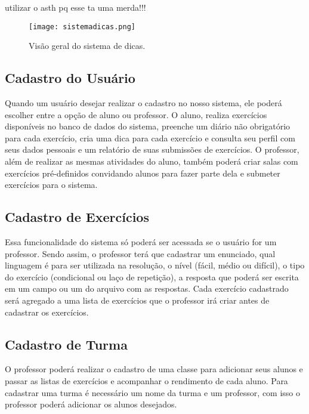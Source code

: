 utilizar o asth pq esse ta uma merda!!!

\begin{figure}[h]
	\captionsetup{justification=centering}
	\texttt{[image: sistemadicas.png]}
	\caption{Visão geral do sistema de dicas.}
	\label{figura:sistemadicas}
\end{figure}

\subsection{Cadastro do Usuário}

Quando um usuário desejar realizar o cadastro no nosso sistema, ele poderá escolher entre a opção de aluno ou professor. O aluno, realiza exercícios disponíveis no banco de dados do sistema, preenche um diário não obrigatório para cada exercício, cria uma dica para cada exercício e consulta seu perfil com seus dados pessoais e um relatório de suas submissões de exercícios. O professor, além de realizar as mesmas atividades do aluno, também poderá criar salas com exercícios pré-definidos convidando alunos para fazer parte dela e submeter exercícios para o sistema.

\subsection{Cadastro de Exercícios}

Essa funcionalidade do sistema só poderá ser acessada se o usuário for um professor. Sendo assim, o professor terá que cadastrar um enunciado, qual linguagem é para ser utilizada na resolução, o nível (fácil, médio ou difícil), o tipo do exercício (condicional ou laço de repetição), a resposta que poderá ser escrita em um campo ou um  do arquivo com as respostas. Cada exercício cadastrado será agregado a uma lista de exercícios que o professor irá criar antes de cadastrar os exercícios.



\subsection{Cadastro de Turma}

O professor poderá realizar o cadastro de uma classe para adicionar seus alunos e passar as listas de exercícios e acompanhar o rendimento de cada aluno. Para cadastrar uma turma é necessário um nome da turma e um professor, com isso o professor poderá adicionar os alunos desejados.

